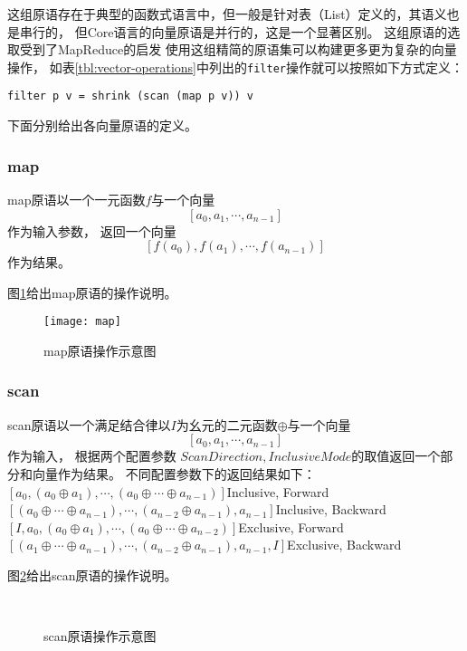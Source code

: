 这组原语存在于典型的函数式语言中，但一般是针对表（List）定义的，其语义也是串行的，
但Core语言的向量原语是并行的，这是一个显著区别。
这组原语的选取受到了MapReduce的启发
使用这组精简的原语集可以构建更多更为复杂的向量操作，
如表\ref{tbl:vector-operations}中列出的\texttt{filter}操作就可以按照如下方式定义：\\
\centerline{\texttt{filter p v = shrink (scan (map p v)) v}}

下面分别给出各向量原语的定义。
\subsubsection{map}
\begin{definition}
  map原语以一个一元函数$f$与一个向量$$[a_0, a_1, \cdots, a_{n-1}]$$作为输入参数，
  返回一个向量$$[f(a_0), f(a_1), \cdots, f(a_{n-1})]$$作为结果。
\end{definition}

图\ref{fig:map-diagram}给出map原语的操作说明。
\begin{figure}[h]
  \centering
  \texttt{[image: map]}
  \caption{map原语操作示意图}
  \label{fig:map-diagram}
\end{figure}

\subsubsection{scan}
\begin{definition}
  scan原语以一个满足结合律以$I$为幺元的二元函数$\oplus$与一个向量$$[a_0, a_1, \cdots, a_{n-1}]$$作为输入，
  根据两个配置参数  $ScanDirection, InclusiveMode$的取值返回一个部分和向量作为结果。
  不同配置参数下的返回结果如下：\\
  $[a_0, (a_0\oplus{}a_1), \cdots, (a_0\oplus{}\cdots\oplus{}a_{n-1})]$\hfill{}Inclusive, Forward\\
  $[(a_0\oplus\cdots\oplus{}a_{n-1}), \cdots, (a_{n-2}\oplus{}a_{n-1}), a_{n-1}]$\hfill{}Inclusive, Backward\\
  $[I, a_0, (a_0\oplus{}a_1), \cdots, (a_0\oplus{}\cdots\oplus{}a_{n-2})]$\hfill{}Exclusive, Forward\\
  $[(a_1\oplus\cdots\oplus{}a_{n-1}), \cdots, (a_{n-2}\oplus{}a_{n-1}), a_{n-1}, I]$\hfill{}Exclusive, Backward\\
\end{definition}

图\ref{fig:scan-diagram}给出scan原语的操作说明。
\begin{figure}[h]
  \centering
  \\
  \caption{scan原语操作示意图}
  \label{fig:scan-diagram}
\end{figure}

